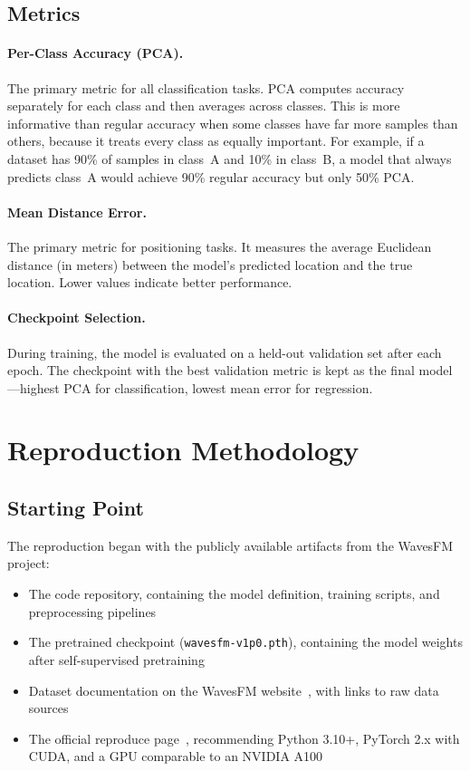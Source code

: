 \documentclass[11pt]{article}
\newcommand{\code}[1]{\texttt{#1}}
\begin{document}
\subsection{Metrics}

\paragraph{Per-Class Accuracy (PCA).} The primary metric for all classification tasks. PCA computes accuracy separately for each class and then averages across classes. This is more informative than regular accuracy when some classes have far more samples than others, because it treats every class as equally important. For example, if a dataset has 90\% of samples in class~A and 10\% in class~B, a model that always predicts class~A would achieve 90\% regular accuracy but only 50\% PCA.

\paragraph{Mean Distance Error.} The primary metric for positioning tasks. It measures the average Euclidean distance (in meters) between the model's predicted location and the true location. Lower values indicate better performance.

\paragraph{Checkpoint Selection.} During training, the model is evaluated on a held-out validation set after each epoch. The checkpoint with the best validation metric is kept as the final model---highest PCA for classification, lowest mean error for regression.

\section{Reproduction Methodology}
\label{sec:methodology}

\subsection{Starting Point}

The reproduction began with the publicly available artifacts from the WavesFM project:
\begin{itemize}
    \item The code repository, containing the model definition, training scripts, and preprocessing pipelines
    \item The pretrained checkpoint (\code{wavesfm-v1p0.pth}), containing the model weights after self-supervised pretraining
    \item Dataset documentation on the WavesFM website~\cite{wavesfm_home}, with links to raw data sources
    \item The official reproduce page~\cite{wavesfm_reproduce}, recommending Python 3.10+, PyTorch 2.x with CUDA, and a GPU comparable to an NVIDIA A100
\end{itemize}
\end{document}
